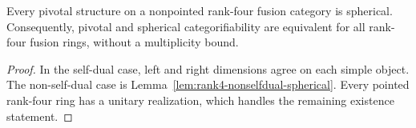 \begin{corollary}\label{cor:rank4-pivotal-spherical-unbounded}
Every pivotal structure on a nonpointed rank-four fusion category is
spherical. Consequently, pivotal and spherical categorifiability are
equivalent for all rank-four fusion rings, without a multiplicity bound.
\end{corollary}
\begin{proof}
In the self-dual case, left and right dimensions agree on each simple
object. The non-self-dual case is Lemma~\ref{lem:rank4-nonselfdual-spherical}.
Every pointed rank-four ring has a unitary realization, which handles
the remaining existence statement.
\end{proof}
